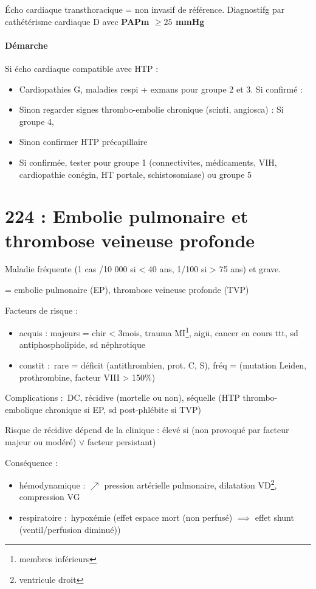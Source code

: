 Écho cardiaque transthoracique = non invasif de référence. Diagnostifg par
cathétérisme cardiaque D avec \textbf{PAPm $\ge 25$ mmHg}

\paragraph{Démarche}
Si écho cardiaque compatible avec HTP :
\begin{itemize}
  \item Cardiopathies G, maladies respi + exmans pour groupe 2 et 3. Si confirmé
    : \faHandStopO
  \item Sinon regarder signes thrombo-embolie chronique (scinti, angiosca) : Si
    groupe 4, \faHandStopO
  \item Sinon confirmer HTP précapillaire 
  \item Si confirmée, tester pour groupe 1 (connectivites, médicaments, VIH,
    cardiopathie conégin, HT portale, schistosomiase) ou groupe 5
\end{itemize}



\section{224 : Embolie pulmonaire et thrombose veineuse profonde}%
\label{sec:224_embolie_pulmonaire_et_thrombose_veineuse_profonde}

Maladie fréquente (1 cas /10 000 si < 40 ans, 1/100 si > 75 ans) et grave.

= {embolie pulmonaire (EP), thrombose veineuse profonde (TVP)}

Facteurs de risque :
\begin{itemize}
  \item acquis : majeurs = chir < 3mois, trauma MI\footnote{membres inférieurs},
    \faHospitalO{} aigü, cancer en cours  ttt, sd antiphospholipide, sd
    néphrotique
  \item constit : rare = déficit (antithrombien, prot. C, S), fréq = (mutation {Leiden,
    prothrombine}, facteur VIII > 150\%)
\end{itemize}
Complications : DC, récidive (mortelle ou non), séquelle (HTP thrombo-embolique
chronique si EP, sd post-phlébite si TVP)

Risque de récidive dépend de la clinique : élevé si (non provoqué par facteur
majeur ou modéré) $\vee$ facteur persistant)

Conséquence :
\begin{itemize}
  \item hémodynamique : $\nearrow$ pression artérielle pulmonaire, dilatation
    VD\footnote{ventricule droit}, compression VG
  \item respiratoire : hypoxémie (effet espace mort (non perfusé) $\implies$ effet shunt
    (ventil/perfusion diminué))
\end{itemize}

